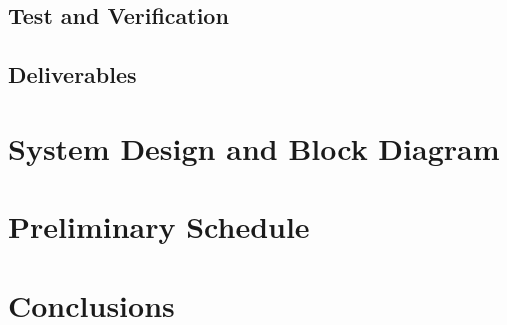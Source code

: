 \documentclass[a4paper, 12pt]{article}
\begin{document}
\subsection{Test and Verification}
\subsection{Deliverables}

\section{System Design and Block Diagram}

\section{Preliminary Schedule}

\section{Conclusions}
\end{document}
